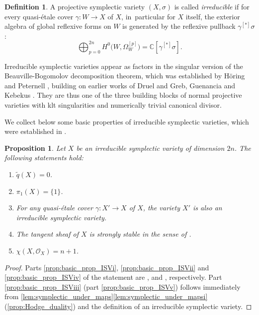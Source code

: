 \documentclass[JEP,XML,SOM,Unicode,published]{cedram}
\theoremstyle{plain}
\newtheorem{prop}[thm]{Proposition}
\theoremstyle{definition}
\newtheorem{dfn}[thm]{Definition}
\newcommand{\C}{\mathbb{C}}
\newcommand{\OO}{\mathcal{O}}
\begin{document}
\begin{dfn}
\label{dfn:IS_variety}
A projective symplectic variety $(X,\sigma)$ is called \emph{irreducible} if for every quasi-étale cover $\gamma \colon W \to X$ of $X$, in~particular for $X$ itself, the exterior algebra of global reflexive forms on $W$ is generated by the reflexive pullback $\gamma^{[*]} \sigma$:
\[
\bigoplus_{p=0}^{2n} H^0 \bigl(W, \Omega_W^{[p]} \bigr) = \C [\gamma^{[*]} \sigma].
\]
\end{dfn}

Irreducible symplectic varieties appear as factors in the singular version of the Beauville-Bogo\-molov decomposition theorem, which was established by Höring and Peternell \cite{HoerPet19}, building on earlier works of Druel \cite{Druel18} and Greb, Guenancia and Kebekus \cite{GGK19}. They are thus one of the three building blocks of normal projective varieties with klt singularities and numerically trivial canonical divisor.

We collect below some basic properties of irreducible symplectic varieties, which were established in \cite{GKP16b,GGK19}.

\begin{prop}
\label{prop:basic_prop_ISV}
Let $X$ be an irreducible symplectic variety of dimension $2n$. The following statements hold:
\begin{enumerate}
\item\label{prop:basic_prop_ISVi}
$\widetilde{q}(X)=0$.

\item\label{prop:basic_prop_ISVii}
$\pi_1(X) = \{ 1 \}$.

\item\label{prop:basic_prop_ISViii}
For any quasi-étale cover $\gamma \colon X'\to X$ of $X$, the variety $X'$ is also an irreducible symplectic variety.

\item\label{prop:basic_prop_ISViv}
The tangent sheaf of $X$ is strongly stable in the sense of \cite[Def.\,7.2]{GKP16b}.

\item\label{prop:basic_prop_ISVv}
$\chi(X, \OO_X) = n+1$.
\end{enumerate}
\end{prop}

\begin{proof}
Parts \eqref{prop:basic_prop_ISVi}, \eqref{prop:basic_prop_ISVii} and \eqref{prop:basic_prop_ISViv} of the statement are \cite[Rem.\,8.17]{GKP16b}, \cite[Cor.\,13.3]{GGK19} and \cite[Prop.\,8.20]{GKP16b}, respectively. Part \eqref{prop:basic_prop_ISViii} (\resp part \eqref{prop:basic_prop_ISVv}) follows immediately from \autoref{lem:symplectic_under_maps}\eqref{lem:symplectic_under_mapsi} (\resp \autoref{prop:Hodge_duality}) and the definition of an irreducible symplectic variety.
\end{proof}
\end{document}
